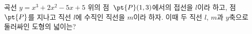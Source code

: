 곡선 $y=x^3+2x^2-5x+5$ 위의 점~$\pt{P}(1{,}\mkern3mu\mathopen{}3)$에서의 접선을 $l$이라 하고, 점~$\pt{P}$를 지나고 직선 $l$에 수직인 직선을 $m$이라 하자. 이때 두 직선 $l$, $m$과 $y$축으로 둘러싸인 도형의 넓이는?
